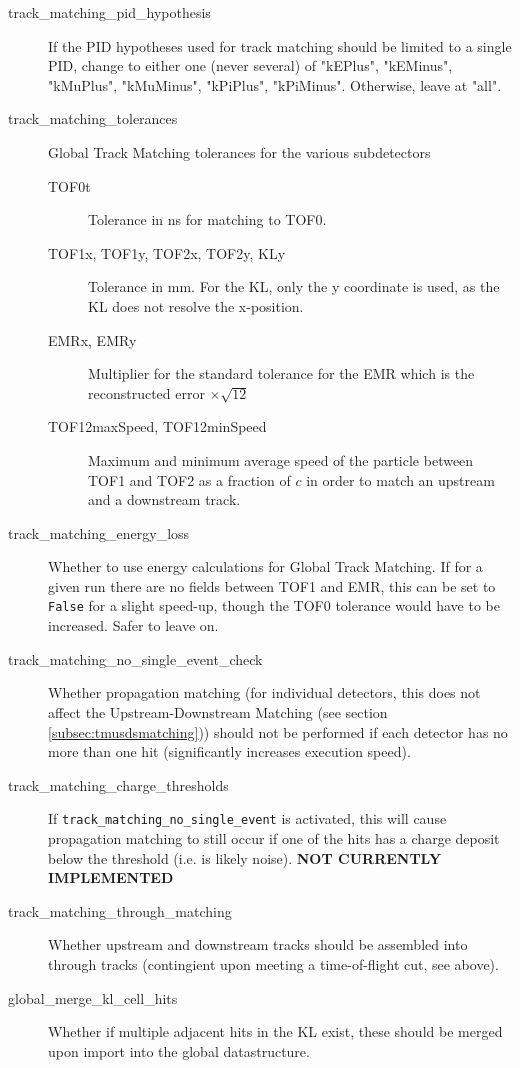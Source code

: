 \begin{description}
  \item[track\_matching\_pid\_hypothesis] If the PID hypotheses used for track matching should be limited to a single PID,
      change to either one (never several) of "kEPlus", "kEMinus", "kMuPlus", "kMuMinus", "kPiPlus", "kPiMinus". Otherwise,
      leave at "all".
  \item[track\_matching\_tolerances] Global Track Matching tolerances for the various subdetectors
  \begin{description}
    \item[TOF0t] Tolerance in ns for matching to TOF0.
    \item[TOF1x, TOF1y, TOF2x, TOF2y, KLy] Tolerance in mm. For the KL, only the y coordinate is used, as the KL does not
        resolve the x-position.
    \item[EMRx, EMRy] Multiplier for the standard tolerance for the EMR which is the reconstructed error $\times \sqrt{12}$
    \item[TOF12maxSpeed, TOF12minSpeed] Maximum and minimum average speed of the particle between TOF1 and TOF2 as a fraction
        of $c$ in order to match an upstream and a downstream track.
  \end{description}
  \item[track\_matching\_energy\_loss] Whether to use energy calculations for Global Track Matching. If for a given run
      there are no fields between TOF1 and EMR, this can be set to \texttt{False} for a slight speed-up, though the TOF0
      tolerance would have to be increased. Safer to leave on.
  \item[track\_matching\_no\_single\_event\_check] Whether propagation matching (for individual detectors, this does not affect the
      Upstream-Downstream Matching (see section \ref{subsec:tmusdsmatching})) should not be performed if each detector has no
      more than one hit (significantly increases execution speed).
  \item[track\_matching\_charge\_thresholds] If \texttt{track\_matching\_no\_single\_event} is activated, this will cause propagation
      matching to still occur if one of the hits has a charge deposit below the threshold (i.e. is likely noise). \textbf{NOT CURRENTLY IMPLEMENTED}
  \item[track\_matching\_through\_matching] Whether upstream and downstream tracks should be assembled into through tracks
      (contingient upon meeting a time-of-flight cut, see above).
  \item[global\_merge\_kl\_cell\_hits] Whether if multiple adjacent hits in the KL exist, these should be merged upon import into the
      global datastructure.
\end{description}
